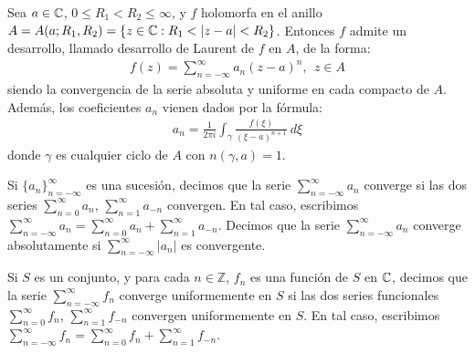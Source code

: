 \begin{teo}
    Sea $a \in \mathbb{C}$, $0 \leq R_1 < R_2 \leq \infty$, y $f$ holomorfa en el anillo $A = A(a;R_1,R_2) = \{ z \in \mathbb{C} : R_1 < |z-a| < R_2\}$. Entonces $f$ admite un desarrollo, llamado desarrollo de Laurent de $f$ en $A$, de la forma:
    \begin{align*}
        f(z) = \sum_{n = -\infty}^{\infty}{a_n(z-a)^n}, \ \ z \in A
    \end{align*}
    siendo la convergencia de la serie absoluta y uniforme en cada compacto de $A$. Además, los coeficientes $a_n$ vienen dados por la fórmula:
    \begin{align*}
        a_n = \frac{1}{2\pi i} \int_{\gamma} {\frac{f(\xi)}{(\xi -a)^{n+1}} \ d \xi}
    \end{align*}
    donde $\gamma$ es cualquier ciclo de $A$ con $n(\gamma,a) = 1$.
\end{teo}

\begin{obs}
    Si $\{a_n\}_{n = -\infty}^{\infty}$ es una sucesión, decimos que la serie $\sum_{n=-\infty}^{\infty} a_n$ converge si las dos series $\sum_{n=0}^{\infty} a_n$, $\sum_{n=1}^{\infty} a_{-n}$ convergen. En tal caso, escribimos $\sum_{n=-\infty}^{\infty} a_n = \sum_{n=0}^{\infty} a_n  +\sum_{n=1}^{\infty} a_{-n}$. Decimos que la serie $\sum_{n=-\infty}^{\infty} a_n$ converge absolutamente si $\sum_{n=-\infty}^{\infty} |a_n|$ es convergente.

    Si $S$ es un conjunto, y para cada $n \in \mathbb{Z}$, $f_n$ es una función de $S$ en $\mathbb{C}$, decimos que la serie $\sum_{n=-\infty}^{\infty} f_n$ converge uniformemente en $S$ si las dos series  funcionales $\sum_{n=0}^{\infty} f_n$, $\sum_{n=1}^{\infty} f_{-n}$ convergen uniformemente en $S$. En tal caso, escribimos $\sum_{n=-\infty}^{\infty} f_n = \sum_{n=0}^{\infty} f_n  +\sum_{n=1}^{\infty} f_{-n}$.
\end{obs}

